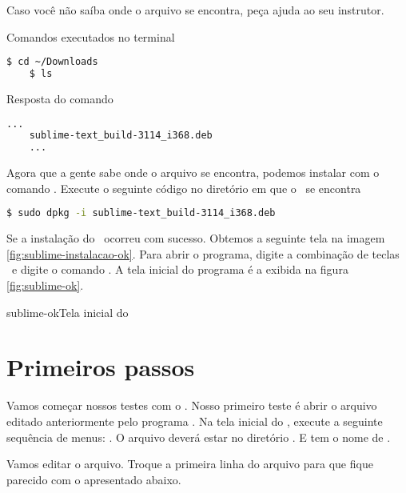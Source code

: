 Caso você não saíba onde o arquivo se encontra, peça ajuda ao seu instrutor.

\begin{multicols}{2}

  Comandos executados no terminal 
  \begin{lstlisting}[language=bash,style=codigos]
    $ cd ~/Downloads
    $ ls
  \end{lstlisting}

  \columnbreak

  Resposta do comando \comandolscompleto
  \begin{lstlisting}[language=bash, style=codigos]
    ...  
    sublime-text_build-3114_i368.deb
    ...  
  \end{lstlisting}

\end{multicols}

Agora que a gente sabe onde o arquivo se encontra, podemos instalar com o comando
\dpkg. Execute o seguinte código no diretório em que o \sublimefilename~se encontra

  \begin{lstlisting}[language=bash,style=codigos]
    $ sudo dpkg -i sublime-text_build-3114_i368.deb
  \end{lstlisting}

Se a instalação do \sublime~ocorreu com sucesso. Obtemos a seguinte tela na 
imagem \ref{fig:sublime-instalacao-ok}. Para abrir o programa, digite a combinação 
de teclas \altfdois~e digite o comando \sublimebin. A tela inicial do programa é 
a exibida na figura \ref{fig:sublime-ok}.

{sublime-ok}{Tela inicial do \sublime}

\section{Primeiros passos}
\label{primeiros-passos}

Vamos começar nossos testes com o \sublime. Nosso primeiro teste é abrir o arquivo 
editado anteriormente pelo programa \gedit. Na tela inicial do \sublime, execute a seguinte
sequência de menus: . O arquivo deverá estar no diretório
. E tem o nome de .

Vamos editar o arquivo. Troque a primeira linha do arquivo para que fique parecido com o
apresentado abaixo.

